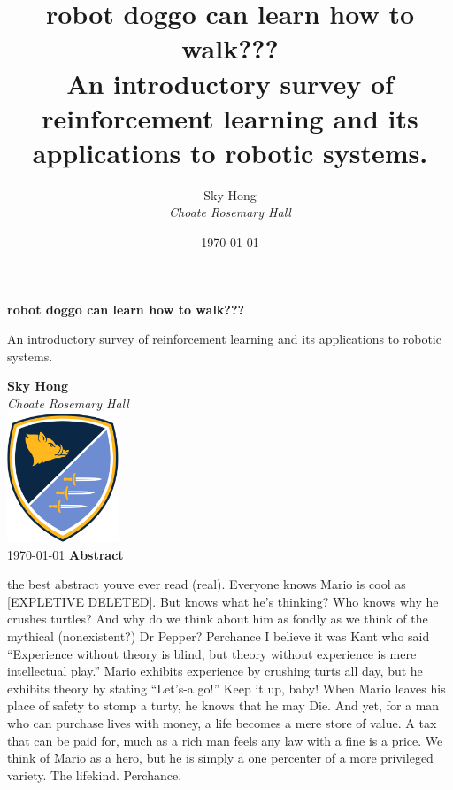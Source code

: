 \documentclass[12pt]{report}
\title{robot doggo can learn how to walk??? \\
    \large{An introductory survey of reinforcement learning and its applications to robotic systems.}}
\author{Sky Hong \\
    \textit{Choate Rosemary Hall}}
\date{\today}
\theoremstyle{definition}
\theoremstyle{remark}
\begin{document}
\begin{titlepage}
    \begin{center}
        \vspace*{1cm}

        \huge
        \textbf{robot doggo can learn how to walk???}

        \vspace{0.5cm}
        \large
        An introductory survey of reinforcement learning and its applications to robotic systems.

        \vfill

        \textbf{Sky Hong} \\
        \textit{Choate Rosemary Hall} \\
        \vspace{0.5cm}
        \includegraphics[width=0.25\textwidth]{figs/choate_logo.png} \\
        \vspace{0.8cm}
        \today
        \vspace{0.8cm}
        \vfill
        \textbf{Abstract}
        \vspace{0.5cm}
    \end{center}
    the best abstract youve ever read (real). Everyone knows Mario is cool as [EXPLETIVE DELETED]. But knows what he's thinking? Who knows why he crushes turtles? And why do we think about him as fondly as we think of the mythical (nonexistent?) Dr Pepper? Perchance I believe it was Kant who said ``Experience without theory is blind, but theory without experience is mere intellectual play.'' Mario exhibits experience by crushing turts all day, but he exhibits theory by stating ``Let's-a go!'' Keep it up, baby! When Mario leaves his place of safety to stomp a turty, he knows that he may Die. And yet, for a man who can purchase lives with money, a life becomes a mere store of value. A tax that can be paid for, much as a rich man feels any law with a fine is a price. We think of Mario as a hero, but he is simply a one percenter of a more privileged variety. The lifekind. Perchance.
\end{titlepage}
\end{document}
